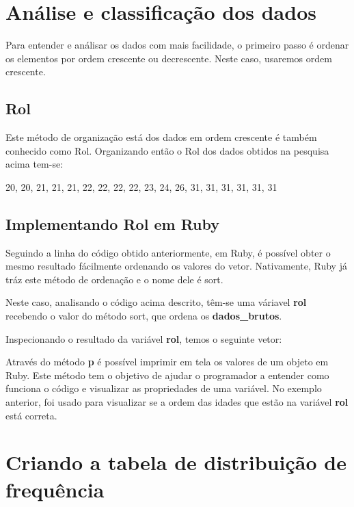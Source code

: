 \documentclass[espaco=simples,appendix=Name]{abnt}
\begin{document}
\section { Análise e classificação dos dados }

Para entender e análisar os dados com mais facilidade, o primeiro passo é ordenar os elementos por ordem crescente ou decrescente. Neste caso, usaremos ordem crescente. 


\subsection { Rol }

Este método de organização está dos dados em ordem crescente é também conhecido como Rol. Organizando então o Rol dos dados obtidos na pesquisa acima tem-se:

20, 20, 21, 21, 21, 22, 22, 22, 22, 23, 24, 26, 31, 31, 31, 31, 31, 31

\subsection { Implementando Rol em Ruby }

Seguindo a linha do código obtido anteriormente, em Ruby, é possível obter o mesmo resultado fácilmente ordenando os valores do vetor. Nativamente, Ruby já tráz este método de ordenação e o nome dele é sort.

 

Neste caso, analisando o código acima descrito, têm-se uma váriavel \textbf{rol} recebendo o valor do método sort, que ordena os \textbf{dados\_brutos}.

Inspecionando o resultado da variável \textbf{rol}, temos o seguinte vetor:


 

Através do método \textbf{p} é possível imprimir em tela os valores de um objeto em Ruby. Este método tem o objetivo de ajudar o programador a entender como funciona o código e visualizar as propriedades de uma variável. No exemplo anterior, foi usado para visualizar se a ordem das idades que estão na variável \textbf{rol} está correta.

\section { Criando a tabela de distribuição de frequência }
\end{document}
